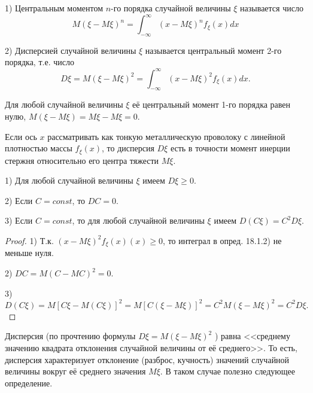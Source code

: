 \begin{definition}
1) Центральным моментом $n$-го порядка случайной
величины $\xi$ называется число
\begin{equation*}
M(\xi − M\xi)^n = \int_{-\infty}^{\infty}(x-M\xi)^n f_{\xi}(x)dx
\end{equation*}

2) Дисперсией случайной величины $\xi$ называется центральный момент 2-го порядка, т.е. число
\begin{equation*}
D\xi = M(\xi − M\xi)^2 = \int_{-\infty}^{\infty}(x-M\xi)^2 f_{\xi}(x)dx.
\end{equation*}
\end{definition}

\begin{zam}
Для любой случайной величины $\xi$ её центральный момент 1-го порядка равен нулю, $M(\xi − M\xi) = M\xi − M\xi = 0$.
\end{zam}

\begin{zam}
Если ось $x$ рассматривать как тонкую металлическую проволоку с линейной плотностью массы $f_{\xi}(x)$, то дисперсия $D\xi$ есть в точности момент инерции стержня относительно его центра тяжести $M\xi$.
\end{zam}

\begin{lemma}
1) Для любой случайной величины $\xi$ имеем $D\xi \geq 0$.

2) Если $C = const$, то $DC = 0$.

3) Если $C = const$, то для любой случайной величины $\xi$ имеем $D(C\xi) = C^2D\xi.$
\end{lemma}
 
\begin{proof}

1) Т.к. $(x − M\xi)^2 f_{\xi}(x) (x) \geq 0$, то интеграл в опред. 18.1.2) не меньше нуля.

2) $DC = M(C − MC)^2 = 0$.

3) $D(C\xi) = M[C\xi −M(C\xi)]^2 = M[C(\xi −M\xi)]^2 = C^2M(\xi − M\xi)^2 = C^2D\xi.$

\end{proof}

\begin{zam}
Дисперсия (по прочтению формулы $D\xi = M(\xi − M\xi)^2$ )
равна <<среднему значению квадрата отклонения случайной величины от её среднего>>. То есть, дисперсия характеризует отклонение (разброс, кучность) значений случайной величины вокруг её среднего значения $M\xi$.
В таком случае полезно следующее определение.	
\end{zam}

